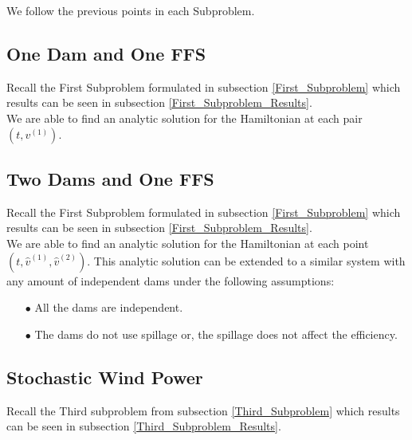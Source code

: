 We follow the previous points in each Subproblem.

\subsection{One Dam and One FFS} \label{First_Subproblem_Num}

Recall the First Subproblem formulated in subsection \ref{First_Subproblem} which results can be seen in subsection \ref{First_Subproblem_Results}.\\

We are able to find an analytic solution for the Hamiltonian at each pair $(t,v^{(1)})$.

\subsection{Two Dams and One FFS} \label{Second_Subproblem_Num}

Recall the First Subproblem formulated in subsection \ref{First_Subproblem} which results can be seen in subsection \ref{First_Subproblem_Results}.\\

We are able to find an analytic solution for the Hamiltonian at each point $(t,\hat{v}^{(1)},\hat{v}^{(2)})$. This analytic solution can be extended to a similar system with any amount of independent dams under the following assumptions:
\begin{enumerate}
\item[$\bullet$] All the dams are independent.
\item[$\bullet$] The dams do not use spillage or, the spillage does not affect the efficiency.
\end{enumerate}

\subsection{Stochastic Wind Power} \label{Third_Subproblem_Num}

Recall the Third subproblem from subsection \ref{Third_Subproblem} which results can be seen in subsection \ref{Third_Subproblem_Results}.\\

